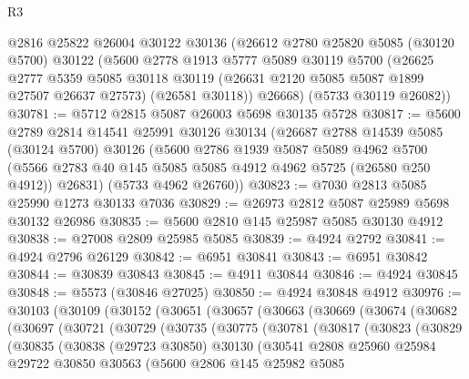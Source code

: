 \begin{lexlean}{R3}
\begin{coremodule}
    @2816
    @25822
    @26004
    @30122
    @30136
    (@26612
      @2780
      @25820
      @5085
      (@30120 @5700)
      @30122
      (@5600
        @2778
        @1913
        @5777
        @5089
        @30119
        @5700
        (@26625
          @2777
          @5359
          @5085
          @30118
          @30119
          (@26631 @2120 @5085 @5087 @1899 @27507 @26637 @27573)
          (@26581 @30118))
        @26668)
      (@5733 @30119 @26082))
@30781 := @5712 @2815 @5087 @26003 @5698 @30135 @5728
@30817 := @5600
    @2789
    @2814
    @14541
    @25991
    @30126
    @30134
    (@26687
      @2788
      @14539
      @5085
      (@30124 @5700)
      @30126
      (@5600
        @2786
        @1939
        @5087
        @5089
        @4962
        @5700
        (@5566 @2783 @40 @145 @5085 @5085 @4912 @4962 @5725 (@26580 @250 @4912))
        @26831)
      (@5733 @4962 @26760))
@30823 := @7030 @2813 @5085 @25990 @1273 @30133 @7036
@30829 := @26973 @2812 @5087 @25989 @5698 @30132 @26986
@30835 := @5600 @2810 @145 @25987 @5085 @30130 @4912
@30838 := @27008 @2809 @25985 @5085
@30839 := @4924 @2792
@30841 := @4924 @2796 @26129
@30842 := @6951 @30841
@30843 := @6951 @30842
@30844 := @30839 @30843
@30845 := @4911 @30844
@30846 := @4924 @30845
@30848 := @5573 (@30846 @27025)
@30850 := @4924 @30848 @4912
@30976 := @30103
    (@30109
      (@30152
        (@30651
          (@30657
            (@30663
              (@30669
                (@30674
                  (@30682
                    (@30697
                      (@30721
                        (@30729
                          (@30735
                            (@30775
                              (@30781
                                (@30817
                                  (@30823
                                    (@30829
                                      (@30835
                                        (@30838
                                          (@29723 @30850)
                                          @30130
                                          (@30541
                                            @2808
                                            @25960
                                            @25984
                                            @29722
                                            @30850
                                            @30563
                                            (@5600
                                              @2806
                                              @145
                                              @25982
                                              @5085

\end{coremodule}
\end{lexlean}
